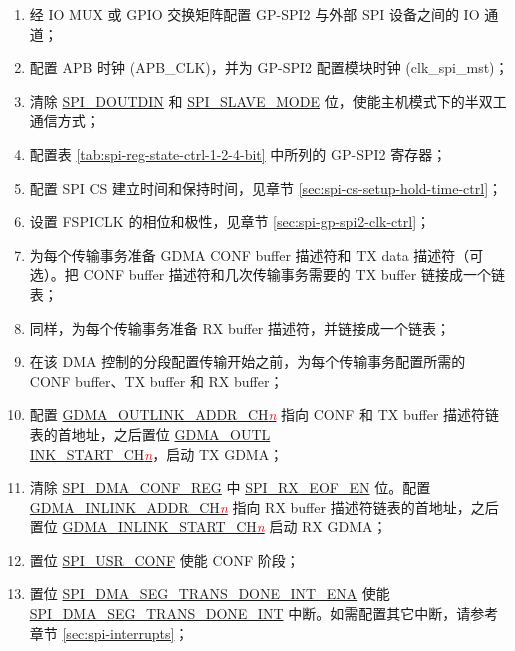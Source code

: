 \documentclass[main\_\_CN.tex]{subfiles}
\begin{document}
 \begin{enumerate}
    \item 经 IO MUX 或 GPIO 交换矩阵配置 GP-SPI2 与外部 SPI 设备之间的 IO 通道；
    \item 配置 APB 时钟 (APB\_CLK)，并为 GP-SPI2 配置模块时钟 (clk\_spi\_mst)；

    \item 清除 \hyperref[fielddesc:SPIDOUTDIN]{SPI\_DOUTDIN} 和 \hyperref[fielddesc:SPISLAVEMODE]{SPI\_SLAVE\_MODE} 位，使能主机模式下的半双工通信方式；

    \item 配置表 \ref{tab:spi-reg-state-ctrl-1-2-4-bit} 中所列的 GP-SPI2 寄存器；

    \item 配置 SPI CS 建立时间和保持时间，见章节  \ref{sec:spi-cs-setup-hold-time-ctrl}；

    \item 设置 FSPICLK 的相位和极性，见章节  \ref{sec:spi-gp-spi2-clk-ctrl}；

   \item 为每个传输事务准备 GDMA CONF buffer 描述符和 TX data 描述符（可选）。把 CONF buffer 描述符和几次传输事务需要的 TX buffer 链接成一个链表；

   \item 同样，为每个传输事务准备 RX buffer 描述符，并链接成一个链表；
   \item 在该 DMA 控制的分段配置传输开始之前，为每个传输事务配置所需的 CONF buffer、TX buffer 和 RX buffer；

   \item 配置 \hyperref[fielddesc:GDMAOUTLINKADDRCHN]{GDMA\_OUTLINK\_ADDR\_CH\textcolor{red}{\it{n}}}  指向 CONF 和 TX buffer 描述符链表的首地址，之后置位 \hyperref[fielddesc:GDMAOUTLINKSTARTCHN]{GDMA\_OUTL\\INK\_START\_CH\textcolor{red}{\it{n}}}，启动 TX GDMA；

   \item 清除 \hyperref[regdesc:SPIDMACONFREG]{SPI\_DMA\_CONF\_REG} 中 \hyperref[fielddesc:SPIRXEOFEN]{SPI\_RX\_EOF\_EN} 位。配置 \hyperref[fielddesc:GDMAINLINKADDRCHN]{GDMA\_INLINK\_ADDR\_CH\textcolor{red}{\it{n}}}  指向 RX buffer 描述符链表的首地址，之后置位 \hyperref[fielddesc:GDMAINLINKSTARTCHN]{GDMA\_INLINK\_START\_CH\textcolor{red}{\it{n}}}  启动 RX GDMA；

   \item 置位 \hyperref[fielddesc:SPIUSRCONF]{SPI\_USR\_CONF} 使能 CONF 阶段；
   \item 置位 \hyperref[fielddesc:SPIDMASEGTRANSDONEINTENA]{SPI\_DMA\_SEG\_TRANS\_DONE\_INT\_ENA} 使能 \hyperref[int:SPIDMASEGTRANSDONEINT]{SPI\_DMA\_SEG\_TRANS\_DONE\_INT} 中断。如需配置其它中断，请参考章节  \ref{sec:spi-interrupts}；


\end{enumerate}
\end{document}
